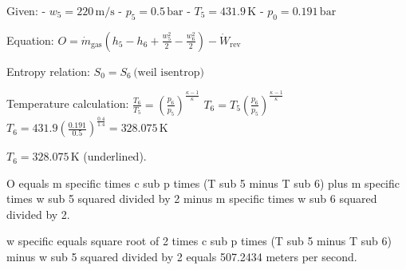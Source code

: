 Given:  
- \( w_5 = 220 \, \text{m/s} \)  
- \( p_5 = 0.5 \, \text{bar} \)  
- \( T_5 = 431.9 \, \text{K} \)  
- \( p_0 = 0.191 \, \text{bar} \)  

Equation:  
\( O = \dot{m}_{\text{gas}} \left( h_5 - h_6 + \frac{w_5^2}{2} - \frac{w_6^2}{2} \right) - \dot{W}_{\text{rev}} \)  

Entropy relation:  
\( S_0 = S_6 \, \text{(weil isentrop)} \)  

Temperature calculation:  
\( \frac{T_6}{T_5} = \left( \frac{p_6}{p_5} \right)^{\frac{\kappa - 1}{\kappa}} \)  
\( T_6 = T_5 \left( \frac{p_6}{p_5} \right)^{\frac{\kappa - 1}{\kappa}} \)  
\( T_6 = 431.9 \left( \frac{0.191}{0.5} \right)^{\frac{0.4}{1.4}} = 328.075 \, \text{K} \)  

\( T_6 = 328.075 \, \text{K} \) (underlined).

O equals m specific times c sub p times (T sub 5 minus T sub 6) plus m specific times w sub 5 squared divided by 2 minus m specific times w sub 6 squared divided by 2.  

w specific equals square root of 2 times c sub p times (T sub 5 minus T sub 6) minus w sub 5 squared divided by 2 equals 507.2434 meters per second.